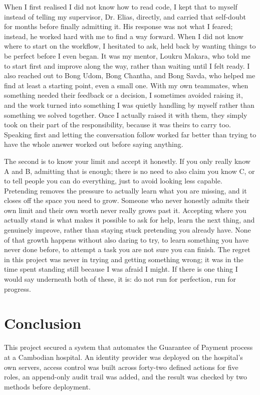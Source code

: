 When I first realised I did not know how to read code, I kept that to myself instead of telling my supervisor, Dr. Elias, directly, and carried that self-doubt for months before finally admitting it. His response was not what I feared; instead, he worked hard with me to find a way forward. When I did not know where to start on the workflow, I hesitated to ask, held back by wanting things to be perfect before I even began. It was my mentor, Loukru Makara, who told me to start first and improve along the way, rather than waiting until I felt ready. I also reached out to Bong Udom, Bong Chantha, and Bong Savda, who helped me find at least a starting point, even a small one. With my own teammates, when something needed their feedback or a decision, I sometimes avoided raising it, and the work turned into something I was quietly handling by myself rather than something we solved together. Once I actually raised it with them, they simply took on their part of the responsibility, because it was theirs to carry too. Speaking first and letting the conversation follow worked far better than trying to have the whole answer worked out before saying anything.

The second is to know your limit and accept it honestly. If you only really know A and B, admitting that is enough; there is no need to also claim you know C, or to tell people you can do everything, just to avoid looking less capable. Pretending removes the pressure to actually learn what you are missing, and it closes off the space you need to grow. Someone who never honestly admits their own limit and their own worth never really grows past it. Accepting where you actually stand is what makes it possible to ask for help, learn the next thing, and genuinely improve, rather than staying stuck pretending you already have. None of that growth happens without also daring to try, to learn something you have never done before, to attempt a task you are not sure you can finish. The regret in this project was never in trying and getting something wrong; it was in the time spent standing still because I was afraid I might. If there is one thing I would say underneath both of these, it is: do not run for perfection, run for progress.

\section{Conclusion}
\label{sec:conc-conclusion}

This project secured a system that automates the Guarantee of Payment process at a Cambodian hospital. An identity provider was deployed on the hospital's own servers, access control was built across forty-two defined actions for five roles, an append-only audit trail was added, and the result was checked by two methods before deployment.

